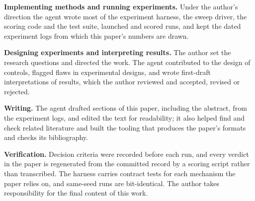 \documentclass{article}
\begin{document}
\textbf{Implementing methods and running experiments.} Under the
author's direction the agent wrote most of the experiment harness, the
sweep driver, the scoring code and the test suite, launched and scored
runs, and kept the dated experiment logs from which this paper's numbers
are drawn.

\textbf{Designing experiments and interpreting results.} The author set
the research questions and directed the work. The agent contributed to
the design of controls, flagged flaws in experimental designs, and wrote
first-draft interpretations of results, which the author reviewed and
accepted, revised or rejected.

\textbf{Writing.} The agent drafted sections of this paper, including
the abstract, from the experiment logs, and edited the text for
readability; it also helped find and check related literature and built
the tooling that produces the paper's formats and checks its
bibliography.

\textbf{Verification.} Decision criteria were recorded before each run,
and every verdict in the paper is regenerated from the committed record
by a scoring script rather than transcribed. The harness carries
contract tests for each mechanism the paper relies on, and same-seed
runs are bit-identical. The author takes responsibility for the final
content of this work.


\end{document}
